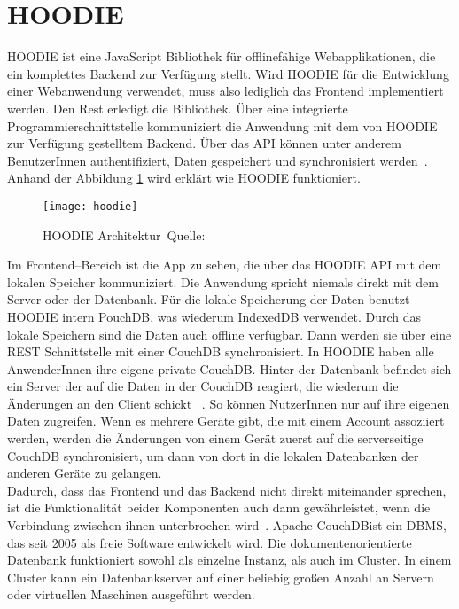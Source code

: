 \section{HOODIE}
HOODIE ist eine JavaScript Bibliothek für offlinefähige Webapplikationen, die ein komplettes Backend zur Verfügung stellt.
Wird HOODIE für die Entwicklung einer Webanwendung verwendet, muss also lediglich das Frontend implementiert werden.
Den Rest erledigt die Bibliothek. Über eine integrierte Programmierschnittstelle kommuniziert die Anwendung mit dem von HOODIE zur Verfügung gestelltem Backend.
Über das \gls{API} können unter anderem BenutzerInnen authentifiziert, Daten gespeichert und synchronisiert werden~\cite{hoodie}.\\
Anhand der Abbildung \ref{fig:hoodie} wird erklärt wie HOODIE funktioniert.
%
\begin{figure}[H]
  \centering
  \texttt{[image: hoodie]}
  \grayRule
  \caption[HOODIE Architektur]{HOODIE Architektur~Quelle:~\cite{hoodie-how}}
  \label{fig:hoodie}
\end{figure}
%
Im Frontend--Bereich ist die App zu sehen, die über das HOODIE \gls{API} mit dem lokalen Speicher kommuniziert.
Die Anwendung spricht niemals direkt mit dem Server oder der Datenbank.
Für die lokale Speicherung der Daten benutzt HOODIE intern PouchDB, was wiederum IndexedDB verwendet.
Durch das lokale Speichern sind die Daten auch offline verfügbar. Dann werden sie über eine \gls{REST} Schnittstelle mit einer CouchDB synchronisiert.
In HOODIE haben alle AnwenderInnen ihre eigene private CouchDB.
Hinter der Datenbank befindet sich ein Server der auf die Daten in der CouchDB reagiert, die wiederum die Änderungen an den Client schickt ~\cite{hoodie-how}.
So können NutzerInnen nur auf ihre eigenen Daten zugreifen. Wenn es mehrere Geräte gibt, die mit einem Account assoziiert werden, werden die Änderungen von einem Gerät zuerst auf die serverseitige CouchDB synchronisiert, um dann von dort in die lokalen Datenbanken der anderen Geräte zu gelangen.\\
Dadurch, dass das Frontend und das Backend nicht direkt miteinander sprechen, ist die Funktionalität beider Komponenten auch dann gewährleistet, wenn die Verbindung zwischen ihnen unterbrochen wird~\cite{hoodie-how}.
% 
% 
Apache CouchDB\tm ist ein \gls{DBMS}, das seit 2005 als freie Software entwickelt wird.
Die dokumentenorientierte Datenbank funktioniert sowohl als einzelne Instanz, als auch im Cluster.
In einem Cluster kann ein Datenbankserver auf einer beliebig großen Anzahl an Servern oder virtuellen Maschinen ausgeführt werden.\\
